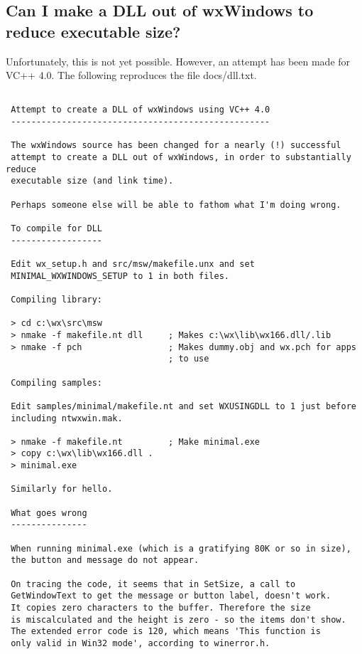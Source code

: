 \subsection{Can I make a DLL out of wxWindows to reduce executable size?}\label{windowsdll}

Unfortunately, this is not yet possible. However, an attempt has been made
for VC++ 4.0. The following reproduces the file docs/dll.txt.

{\small
\begin{verbatim}

 Attempt to create a DLL of wxWindows using VC++ 4.0
 ---------------------------------------------------
 
 The wxWindows source has been changed for a nearly (!) successful
 attempt to create a DLL out of wxWindows, in order to substantially reduce
 executable size (and link time).
 
 Perhaps someone else will be able to fathom what I'm doing wrong.
  
 To compile for DLL
 ------------------
 
 Edit wx_setup.h and src/msw/makefile.unx and set
 MINIMAL_WXWINDOWS_SETUP to 1 in both files.
  
 Compiling library:
 
 > cd c:\wx\src\msw
 > nmake -f makefile.nt dll     ; Makes c:\wx\lib\wx166.dll/.lib
 > nmake -f pch                 ; Makes dummy.obj and wx.pch for apps
                                ; to use

 Compiling samples:
 
 Edit samples/minimal/makefile.nt and set WXUSINGDLL to 1 just before
 including ntwxwin.mak.
 
 > nmake -f makefile.nt         ; Make minimal.exe
 > copy c:\wx\lib\wx166.dll .
 > minimal.exe
 
 Similarly for hello.
 
 What goes wrong
 ---------------
 
 When running minimal.exe (which is a gratifying 80K or so in size),
 the button and message do not appear.
 
 On tracing the code, it seems that in SetSize, a call to
 GetWindowText to get the message or button label, doesn't work.
 It copies zero characters to the buffer. Therefore the size
 is miscalculated and the height is zero - so the items don't show.
 The extended error code is 120, which means 'This function is
 only valid in Win32 mode', according to winerror.h.
 

\end{verbatim}}
